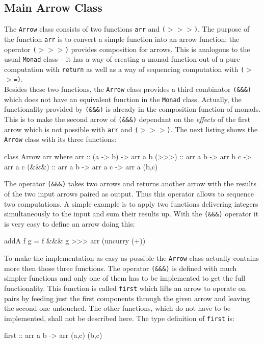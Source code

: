 \documentclass[11pt,a4paper,headsepline, bibtotoc]{scrreprt}
\begin{document}
\subsection{Main Arrow Class}
The {\tt Arrow} class consists of two functions {\tt arr} and {\tt ($>$$>$$>$)}. The purpose of the function {\tt arr} is to convert a simple function into an arrow function; the operator {\tt ($>$$>$$>$)} provides composition for arrows. This is analogous to the usual {\tt Monad} class -- it has a way of creating a monad function out of a pure computation with {\tt return} as well as a way of sequencing computation with {\tt ($>$$>$=)}.\\
Besides these two functions, the {\tt Arrow} class provides a third combinator {\tt (\&\&\&)} which does not have an equivalent function in the {\tt Monad} class. Actually, the functionality provided by {\tt (\&\&\&)} is already in the composition function of monads. This is to make the second arrow of {\tt (\&\&\&)} dependant on the {\it effects} of the first arrow which is not possible with {\tt arr} and {\tt ($>$$>$$>$)}.
The next listing shows the {\tt Arrow} class with its three functions:
\begin{code}
class Arrow arr where
  arr   :: (a -> b) -> arr a b
  (>>>) :: arr a b -> arr b c -> arr a c
  (&&&) :: arr a b -> arr a c -> arr a (b,c)
\end{code}
The operator {\tt (\&\&\&)} takes two arrows and returns another arrow with the results of the two input arrows paired as output. Thus this operator allows to sequence two computations. A simple example is to apply two functions delivering integers simultaneously to the input and sum their results up. With the {\tt (\&\&\&)} operator it is very easy to define an arrow doing this:
\begin{code}
addA f g = f &&& g >>> arr (uncurry (+))
\end{code}
To make the implementation as easy as possible the {\tt Arrow} class actually contains more then those three functions. The operator {\tt (\&\&\&)} is defined with much simpler functions and only one of them has to be implemented to get the full functionality. This function is called {\tt first} which lifts an arrow to operate on pairs by feeding just the first components through the given arrow and leaving the second one untouched. The other functions, which do not have to be implemented, shall not be described here. The type definition of \texttt{first} is:
\begin{code}
first :: arr a b -> arr (a,c) (b,c) 
\end{code}
\end{document}

